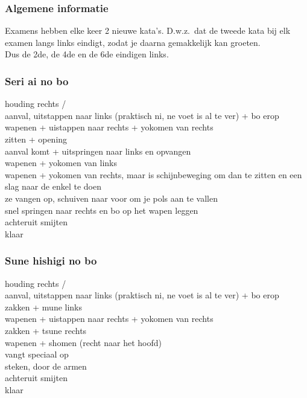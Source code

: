 \subsubsection{Algemene informatie}

Examens hebben elke keer 2 nieuwe kata's. D.w.z.\ dat de tweede kata bij elk examen langs links eindigt, zodat je daarna gemakkelijk kan groeten.\\
Dus de 2de, de 4de en de 6de eindigen links.

\subsubsection{Seri ai no bo}

houding rechts /\\
aanval, uitstappen naar links (praktisch ni, ne voet is al te ver) + bo erop\\
wapenen + uistappen naar rechts + yokomen van rechts\\
zitten + opening\\
aanval komt + uitspringen naar links en opvangen\\
wapenen + yokomen van links\\
wapenen + yokomen van rechts, maar is schijnbeweging om dan te zitten en een slag naar de enkel te doen\\
ze vangen op, schuiven naar voor om je pols aan te vallen\\
snel springen naar rechts en bo op het wapen leggen\\
achteruit smijten\\
klaar

\subsubsection{Sune hishigi no bo}

houding rechts /\\
aanval, uitstappen naar links (praktisch ni, ne voet is al te ver) + bo erop\\
zakken + mune links\\
wapenen + uistappen naar rechts + yokomen van rechts\\
zakken + tsune rechts\\
wapenen + shomen (recht naar het hoofd)\\
vangt speciaal op\\
steken, door de armen\\
achteruit smijten\\
klaar

